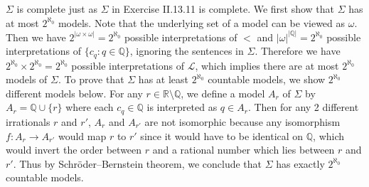\documentclass[12pt]{article}
\theoremstyle{definition}
\newenvironment{customthm}[1]
  {\renewcommand\theinnercustomthm{#1}\innercustomthm}
  {\endinnercustomthm}
\begin{document}
\begin{customthm}{II.13.12} $\Sigma$ is complete just as $\Sigma$ in Exercise II.13.11 is complete. We first show that $\Sigma$ has at most $2^{\aleph_0}$ models. Note that the underlying set of a model can be viewed as $\omega$. Then we have $2^{|\omega\times\omega|}=2^{\aleph_0}$ possible interpretations of $<$ and $|\omega|^{|\mathbb{Q}|}=2^{\aleph_0}$ possible interpretations of $\{c_q:q\in\mathbb{Q}\}$, ignoring the sentences in $\Sigma$. Therefore we have $2^{\aleph_0}\times2^{\aleph_0}=2^{\aleph_0}$ possible interpretations of $\mathcal{L}$, which implies there are at most $2^{\aleph_0}$ models of $\Sigma$. To prove that $\Sigma$ has at least $2^{\aleph_0}$ countable models, we show $2^{\aleph_0}$ different models below. For any $r\in\mathbb{R}\setminus\mathbb{Q}$, we define a model $A_r$ of $\Sigma$ by $A_r=\mathbb{Q}\cup\{r\}$ where each $c_q\in\mathbb{Q}$ is interpreted as $q\in A_r$. Then for any 2 different irrationals $r$ and $r'$, $A_r$ and $A_{r'}$ are not isomorphic because any isomorphism $f:A_r\rightarrow A_{r'}$ would map $r$ to $r'$ since it would have to be identical on $\mathbb{Q}$, which would invert the order between $r$ and a rational number which lies between $r$ and $r'$. Thus by Schröder–Bernstein theorem, we conclude that $\Sigma$ has exactly $2^{\aleph_0}$ countable models.
\end{customthm}
\end{document}
